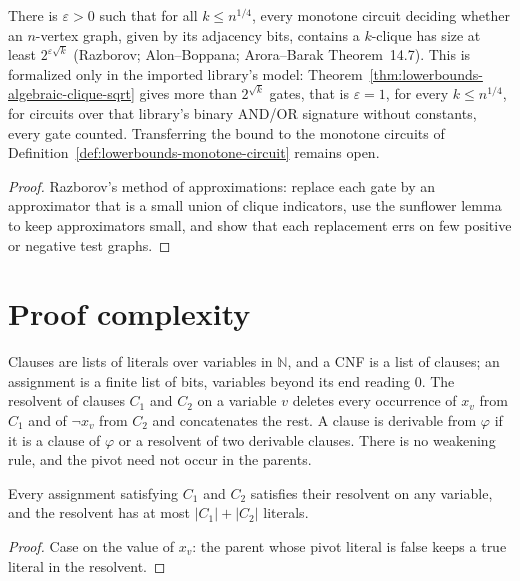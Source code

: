 \begin{theorem}
  \label{thm:lowerbounds-monotone-clique}
  \notready
  There is $\varepsilon > 0$ such that for all $k \le n^{1/4}$, every monotone
  circuit deciding whether an $n$-vertex graph, given by its adjacency bits,
  contains a $k$-clique has size at least $2^{\varepsilon \sqrt{k}}$
  (Razborov; Alon--Boppana; Arora--Barak Theorem~14.7). This is formalized
  only in the imported library's model:
  Theorem~\ref{thm:lowerbounds-algebraic-clique-sqrt} gives more than
  $2^{\sqrt{k}}$ gates, that is $\varepsilon = 1$, for every $k \le n^{1/4}$,
  for circuits over that library's binary AND/OR signature without constants,
  every gate counted. Transferring the bound to the monotone circuits of
  Definition~\ref{def:lowerbounds-monotone-circuit} remains open.
\end{theorem}
\begin{proof}
  Razborov's method of approximations: replace each gate by an approximator
  that is a small union of clique indicators, use the sunflower lemma to keep
  approximators small, and show that each replacement errs on few positive or
  negative test graphs.
\end{proof}

\section{Proof complexity}
\label{sec:lowerbounds-proof-complexity}

\begin{definition}[Resolution]
  \label{def:lowerbounds-resolution}
  \leanok
  Clauses are lists of literals over variables in $\mathbb{N}$, and a CNF is a
  list of clauses; an assignment is a finite list of bits, variables beyond its
  end reading $0$. The resolvent of clauses $C_1$ and $C_2$ on a variable $v$
  deletes every occurrence of $x_v$ from $C_1$ and of $\neg x_v$ from $C_2$
  and concatenates the rest. A clause is derivable from $\varphi$ if it is a
  clause of $\varphi$ or a resolvent of two derivable clauses. There is no
  weakening rule, and the pivot need not occur in the parents.
\end{definition}

\begin{lemma}
  \label{lem:lowerbounds-resolvent}
  \leanok
  Every assignment satisfying $C_1$ and $C_2$ satisfies their resolvent on any
  variable, and the resolvent has at most $|C_1| + |C_2|$ literals.
\end{lemma}
\begin{proof}
  \leanok
  Case on the value of $x_v$: the parent whose pivot literal is false keeps a
  true literal in the resolvent.
\end{proof}

